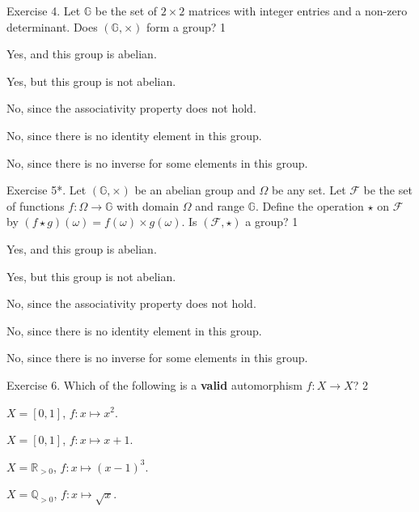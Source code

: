 \documentclass[../lecture-notes-148x210.tex]{subfiles}
\begin{document}
\begin{xexercise}
    {Exercise 4.} {Let $\mathbb{G}$ be the set of $2\times 2$ matrices with integer 
    entries and a non-zero determinant. Does $(\mathbb{G},\times)$ form a group?} {1} {
        \item Yes, and this group is abelian.
        \item Yes, but this group is not abelian.
        \item No, since the associativity property does not hold.
        \item No, since there is no identity element in this group.
        \item No, since there is no inverse for some elements in this group.
    }
\end{xexercise}

\begin{xexercise}
    {Exercise 5*.} {Let $(\mathbb{G},\times)$ be an abelian group and $\Omega$
    be any set. Let $\mathcal{F}$ be the set of functions $f: \Omega \to
    \mathbb{G}$ with domain $\Omega$ and range $\mathbb{G}$. Define the
    operation $\star$ on $\mathcal{F}$ by $(f \star g)(\omega) = f(\omega)\times
    g(\omega)$. Is $(\mathcal{F}, \star)$ a group?} {1} {
        \item Yes, and this group is abelian.
        \item Yes, but this group is not abelian.
        \item No, since the associativity property does not hold.
        \item No, since there is no identity element in this group.
        \item No, since there is no inverse for some elements in this group.
    }
\end{xexercise}

\begin{xexercise}
    {Exercise 6.}
    {Which of the following is a \textbf{valid} automorphism $f: X \to X$?\vspace{-10pt}}
    {2}
    {
        \item $X = [0,1]$, $f: x \mapsto x^2$.
        \item $X = [0,1]$, $f: x \mapsto x + 1$.
        \item $X = \mathbb{R}_{>0}$, $f: x \mapsto (x-1)^3$.
        \item $X = \mathbb{Q}_{>0}$, $f: x \mapsto \sqrt{x}$.
    }
\end{xexercise}
\end{document}
